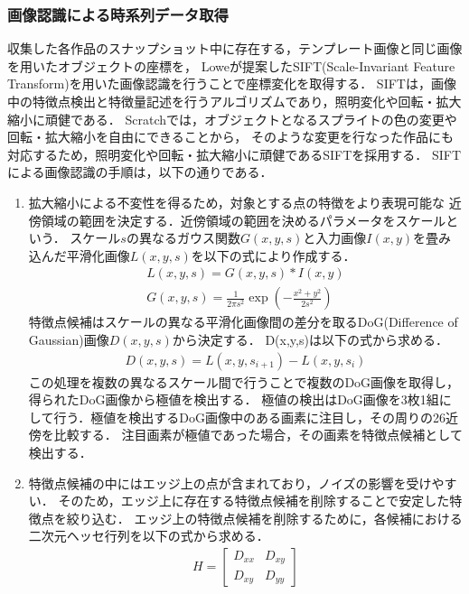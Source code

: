 \documentclass[11pt]{jreport}
\begin{document}
\subsubsection{画像認識による時系列データ取得}
収集した各作品のスナップショット中に存在する，テンプレート画像と同じ画像を用いたオブジェクトの座標を，
Loweが提案したSIFT(Scale-Invariant Feature Transform)\cite{sift}を用いた画像認識を行うことで座標変化を取得する．
SIFTは，画像中の特徴点検出と特徴量記述を行うアルゴリズムであり，照明変化や回転・拡大縮小に頑健である．
Scratchでは，オブジェクトとなるスプライトの色の変更や回転・拡大縮小を自由にできることから，
そのような変更を行なった作品にも対応するため，照明変化や回転・拡大縮小に頑健であるSIFTを採用する．
SIFTによる画像認識の手順は，以下の通りである．
\begin{enumerate}
     \item {} 拡大縮小による不変性を得るため，対象とする点の特徴をより表現可能な
    近傍領域の範囲を決定する．近傍領域の範囲を決めるパラメータをスケールという．
    スケール$s$の異なるガウス関数$G(x,y,s)$と入力画像$I(x,y)$を畳み込んだ平滑化画像$L(x,y,s)$を以下の式により作成する．
    \begin{eqnarray}
        L(x,y,s) = G(x,y,s) * I(x,y) \\
        G(x,y,s) = \frac{1}{2\pi s^2} \exp (- \frac{x^2+y^2}{2s^2})
    \end{eqnarray}
    特徴点候補はスケールの異なる平滑化画像間の差分を取るDoG(Difference of Gaussian)画像$D(x,y,s)$から決定する．
    D(x,y,s)は以下の式から求める．
    \begin{eqnarray}
        D(x,y,s) = L(x,y,s_{i+1}) - L(x,y,s_i)
    \end{eqnarray}
    この処理を複数の異なるスケール間で行うことで複数のDoG画像を取得し，得られたDoG画像から極値を検出する．
    極値の検出はDoG画像を3枚1組にして行う．極値を検出するDoG画像中のある画素に注目し，その周りの26近傍を比較する．
    注目画素が極値であった場合，その画素を特徴点候補として検出する．
    \item {} 特徴点候補の中にはエッジ上の点が含まれており，ノイズの影響を受けやすい．
    そのため，エッジ上に存在する特徴点候補を削除することで安定した特徴点を絞り込む．
    エッジ上の特徴点候補を削除するために，各候補における二次元ヘッセ行列を以下の式から求める．
    \begin{eqnarray}
        H = \begin{bmatrix}
            D_{xx} & D_{xy} \\
            D_{xy} & D_{yy}

\end{bmatrix}
\end{eqnarray}
\end{enumerate}
\end{document}
